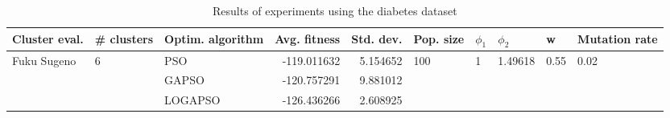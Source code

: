 \begin{table}
\centering
\caption{Results of experiments using the diabetes dataset}
\begin{tabular}{lllrrlllll}
\toprule
               Cluster eval. &        \# clusters & Optim. algorithm &  Avg. fitness &  Std. dev. &            Pop. size &         $\phi_{1}$ &               $\phi_{2}$ &                     w &         Mutation rate \\
\midrule
\multirow{3}{*}{Fuku Sugeno} & \multirow{3}{*}{6} &              PSO &   -119.011632 &   5.154652 & \multirow{3}{*}{100} & \multirow{3}{*}{1} & \multirow{3}{*}{1.49618} & \multirow{3}{*}{0.55} & \multirow{3}{*}{0.02} \\
                             &                    &            GAPSO &   -120.757291 &   9.881012 &                      &                    &                          &                       &                       \\
                             &                    &          LOGAPSO &   -126.436266 &   2.608925 &                      &                    &                          &                       &                       \\
\bottomrule
\end{tabular}
\end{table}
